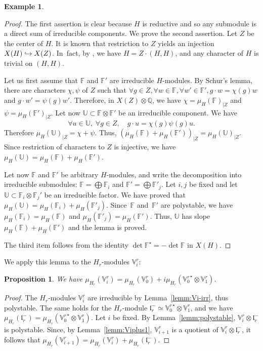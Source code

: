 \documentclass[JEP,XML,SOM,Unicode,NoFloatCountersInSection]{cedram}
\newcommand{\hto}{\mathrel{\lhook\joinrel\to}}
\newcommand{\citestar}[3]{\cite[#3]{#1}}
\theoremstyle{plain}
\newtheorem{prop}[theo]{Proposition}
\theoremstyle{definition}
\newtheorem{exem}[theo]{Example}
\let\rgy r
\newcommand{\bF}{\mathbb{F}}
\newcommand{\bU}{\mathbb{U}}
\newcommand{\bQ}{\mathbb{Q}}
\newcommand{\Vr}{\mathbb{V}^\rgy}
\newcommand{\fl}{\mathfrak{l}}
\begin{document}
\begin{exem}
\begin{proof} The first assertion is clear because $H$ is reductive and so any submodule
is a direct sum of irreducible components. We prove the second assertion.
Let $Z$ be the center of $H$. It is known that restriction to $Z$ yields an injection $X(H)
\hto X(Z)$. In~fact, by \citestar{borel}*{Prop.\,14.2},
we have $H=Z \cdot (H,H)$, and any character of $H$ is trivial on $(H,H)$.

Let us first assume that $\bF$ and $\bF'$ are irreducible $H$-modules. By Schur's lemma, there are
characters $\chi,\psi$ of $Z$ such that $\forall g \in Z, \forall w \in \bF, \forall w' \in \bF', g
\cdot w = \chi(g)w$
and $g \cdot w' = \psi(g)w'$. Therefore, in $X(Z) \otimes \bQ$, we have
$\chi = \mu_H(\bF)_{|Z}$ and $\psi = \mu_H(\bF')_{|Z}$.
Let now $\bU \subset \bF \otimes \bF'$ be an irreducible component. We have
$$\forall u \in \bU,\; \forall g \in Z,\quad g\cdot u = \chi(g) \psi(g) u.$$
Therefore $\mu_H(\bU)_{|Z} = \chi + \psi$.
Thus, ${(\mu_H(\bF)+\mu_H(\bF'))}_{|Z} = \mu_H(\bU)_{|Z}$.
Since restriction of characters to $Z$ is injective, we have $\mu_H(\bU) = \mu_H(\bF) + \mu_H(\bF')$.

Let now $\bF$ and $\bF'$ be arbitrary $H$-modules, and write the decomposition into irreducible submodules:
$\bF=\bigoplus \bF_i$ and $\bF'=\bigoplus \bF'_j$. Let $i,j$ be fixed and let $\bU \subset \bF_i
\otimes \bF_j'$ be an
irreducible factor. We have proved that $\mu_H(\bU)=\mu_H(\bF_i)+\mu_H(\bF'_j)$. Since~$\bF$ and~$\bF'$
are polystable,
we have $\mu_H(\bF_i)=\mu_H(\bF)$ and $\mu_H(\bF'_j)=\mu_H(\bF')$. Thus, $\bU$ has slope
$\mu_H(\bF)+\mu_H(\bF')$ and the lemma is proved.

The third item follows from the identity $\det \bF^\star = -\det \bF$ in $X(H)$.
\end{proof}

We apply this lemma to the $H_\rgy$-modules $\Vr_i$:

\begin{prop}
\label{prop:calcul-pente}
We have $\mu_{H_\rgy}(\Vr_i) = \mu_{H_\rgy}(\Vr_0)+i\mu_{H_\rgy}({\Vr_0}^\star \otimes \Vr_1)$.
\end{prop}
\begin{proof}
The $H_\rgy$-modules $\Vr_i$ are irreducible by Lemma~\ref{lemm:Vi-irr}, thus polystable.
The same holds for the $H_\rgy$-module $\fl_\rgy^-\simeq {\Vr_0}^\star \otimes \Vr_1$, and we have
$\mu_{H_\rgy}(\fl_\rgy^-) = \mu_{H_\rgy}({\Vr_0}^\star \otimes \Vr_1)$. Let $i$ be fixed.
By Lemma~\ref{lemm:polystable}, $\Vr_i \otimes \fl_\rgy^-$ is polystable. Since, by
Lemma~\ref{lemm:Viplus1},
$\Vr_{i+1}$ is a quotient of $\Vr_i \otimes \fl_\rgy^-$, it follows that
$\mu_{H_\rgy}(\Vr_{i+1}) = \mu_{H_\rgy}(\Vr_i) + \mu_{H_\rgy}(\fl_\rgy^-)$.
\end{proof}


\end{exem}
\end{document}
